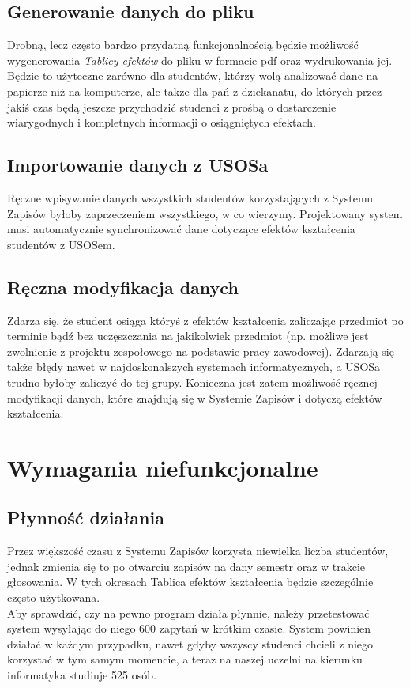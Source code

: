 \documentclass{article}
\begin{document}
\subsection{Generowanie danych do pliku}
Drobną, lecz często bardzo przydatną funkcjonalnością będzie możliwość wygenerowania \textit{Tablicy efektów} do pliku w formacie pdf oraz wydrukowania jej.
Będzie to użyteczne zarówno dla studentów, którzy wolą analizować dane na papierze niż na komputerze, ale także dla pań z dziekanatu, do których przez jakiś czas będą jeszcze przychodzić studenci z prośbą o dostarczenie
wiarygodnych i kompletnych informacji o osiągniętych efektach.

\subsection{Importowanie danych z USOSa}
Ręczne wpisywanie danych wszystkich studentów korzystających z Systemu Zapisów byłoby zaprzeczeniem wszystkiego, w co wierzymy. Projektowany system musi automatycznie synchronizować dane dotyczące efektów kształcenia studentów z USOSem.


\subsection{Ręczna modyfikacja danych}
Zdarza się, że student osiąga któryś z efektów kształcenia zaliczając przedmiot po terminie bądź bez uczęszczania na jakikolwiek przedmiot (np. możliwe jest zwolnienie z projektu zespołowego na podstawie pracy zawodowej). Zdarzają się także błędy nawet w najdoskonalszych systemach informatycznych, a USOSa trudno byłoby zaliczyć do tej grupy. Konieczna jest zatem możliwość ręcznej modyfikacji danych, które znajdują się w Systemie Zapisów i dotyczą efektów kształcenia.



\section{Wymagania niefunkcjonalne}

\subsection{Płynność działania}
Przez większość czasu z Systemu Zapisów korzysta niewielka liczba studentów, jednak zmienia się to po otwarciu zapisów na dany semestr oraz w trakcie głosowania. W tych okresach Tablica efektów kształcenia będzie szczególnie często użytkowana.
\\ Aby sprawdzić, czy na pewno program działa płynnie, należy przetestować system wysyłając do niego 600 zapytań w krótkim czasie. System powinien działać w każdym przypadku, nawet gdyby wszyscy studenci chcieli z niego korzystać w tym samym momencie, a teraz 
na naszej uczelni na kierunku informatyka studiuje 525 osób.
\end{document}
